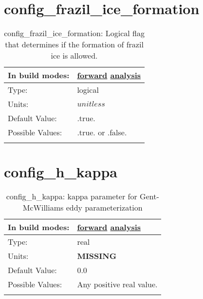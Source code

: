 \section[config\_frazil\_ice\_formation]{config\_frazil\_ice\_formation}
\label{sec:nm_sec_config_frazil_ice_formation}
\begin{center}
\begin{longtable}{| p{2.0in} || p{4.0in} |}
    \hline
    In build modes: & \hyperref[subsec:forward_nm_tab_forcing]{forward} \hyperref[subsec:analysis_nm_tab_forcing]{analysis} \\
    \hline
    Type: & logical \\
    \hline
    Units: & $unitless$ \\
    \hline
    Default Value: & .true. \\
    \hline
    Possible Values: & .true. or .false. \\
    \hline
    \caption{config\_frazil\_ice\_formation: Logical flag that determines if the formation of frazil ice is allowed.}
\end{longtable}
\end{center}
\section[config\_h\_kappa]{config\_h\_kappa}
\label{sec:nm_sec_config_h_kappa}
\begin{center}
\begin{longtable}{| p{2.0in} || p{4.0in} |}
    \hline
    In build modes: & \hyperref[subsec:forward_nm_tab_standard_GM]{forward} \hyperref[subsec:analysis_nm_tab_standard_GM]{analysis} \\
    \hline
    Type: & real \\
    \hline
    Units: & {\bf \color{red} MISSING} \\
    \hline
    Default Value: & 0.0 \\
    \hline
    Possible Values: & Any positive real value. \\
    \hline
    \caption{config\_h\_kappa: kappa parameter for Gent-McWilliams eddy parameterization}
\end{longtable}
\end{center}
